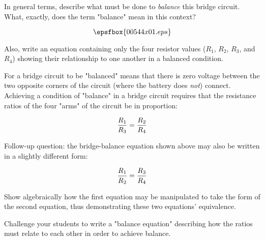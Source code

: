 

In general terms, describe what must be done to {\it balance} this bridge circuit.  What, exactly, does the term "balance" mean in this context?

$$\epsfbox{00544x01.eps}$$

Also, write an equation containing only the four resistor values ($R_1$, $R_2$, $R_3$, and $R_4$) showing their relationship to one another in a balanced condition.







For a bridge circuit to be "balanced" means that there is zero voltage between the two opposite corners of the circuit (where the battery does {\it not}) connect.  Achieving a condition of "balance" in a bridge circuit requires that the resistance ratios of the four "arms" of the circuit be in proportion:

$${R_1 \over R_3} = {R_2 \over R_4}$$

\vskip 10pt

Follow-up question: the bridge-balance equation shown above may also be written in a slightly different form:

$${R_1 \over R_2} = {R_3 \over R_4}$$

Show algebraically how the first equation may be manipulated to take the form of the second equation, thus demonstrating these two equations' equivalence.







Challenge your students to write a "balance equation" describing how the ratios must relate to each other in order to achieve balance.




